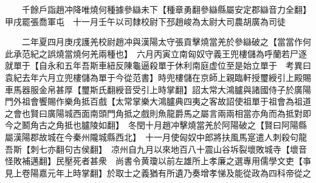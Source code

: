 　　千餘戶詣趙冲降唯燒何種據參䜌未下【種章勇翻參䜌縣屬安定郡䜌音力全翻】甲戌罷張喬軍屯　十一月壬午以司隸校尉下邳趙峻為太尉大司農胡廣為司徒

　　二年夏四月庚戌護羌校尉趙冲與漢陽太守張貢擊燒當羌於參䜌破之【當當作何此承范紀之誤燒當燒何羌兩種也】　六月丙寅立南匈奴守義王兜樓儲為呼蘭若尸逐就單于【自永和五年吾斯車紐反陳龜逼殺單于休利南庭虚位至是始立單于　考異曰袁紀去年六月立兜樓儲為單于今從范書】時兜樓儲在京師上親臨軒授璽綬引上殿賜車馬器服金帛甚厚【璽斯氏翻綬音受引上時掌翻】詔太常大鴻臚與諸國侍子於廣陽門外祖會饗賜作樂角抵百戲【太常掌樂大鴻臚典四夷之客故詔使祖單于祖會為祖道之會也賢曰廣陽城西面南頭門角抵之戲則魚龍爵馬之屬言兩兩相當亦角而為抵對即今之鬭角古之角抵也臚陵如翻】　冬閏十月趙冲擊燒當羌於阿陽破之【賢曰阿陽縣屬漢陽郡故城在今秦州隴城縣西北】　十一月使匈奴中郎將扶風馬寔遣人刺殺句龍吾斯【刺七亦翻句古侯翻】　凉州自九月以來地百八十震山谷坼裂壞敗城寺【壞音怪敗補邁翻】民壓死者甚衆　尚書令黄瓊以前左雄所上孝廉之選專用儒學文吏【亊見上卷陽嘉元年上時掌翻】於取士之義猶有所遺乃奏增孝悌及能從政為四科帝從之

